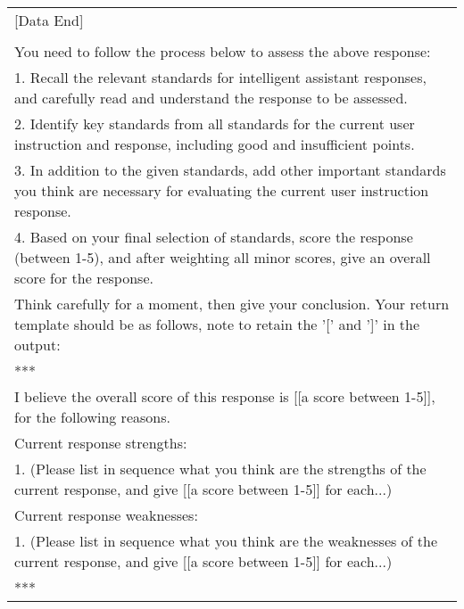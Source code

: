 \begin{table*}[tbh!]
\begin{tabularx}{\textwidth}{X}
    [Data End]\\
    
    \\
    You need to follow the process below to assess the above response:\\
    1. Recall the relevant standards for intelligent assistant responses, and carefully read and understand the response to be assessed.\\
    2. Identify key standards from all standards for the current user instruction and response, including good and insufficient points.\\
    3. In addition to the given standards, add other important standards you think are necessary for evaluating the current user instruction response.\\
    4. Based on your final selection of standards, score the response (between 1-5), and after weighting all minor scores, give an overall score for the response.\\
    Think carefully for a moment, then give your conclusion. Your return template should be as follows, note to retain the '[' and ']' in the output:\\
    ***\\
    I believe the overall score of this response is [[a score between 1-5]], for the following reasons.\\
    Current response strengths:\\
    1. (Please list in sequence what you think are the strengths of the current response, and give [[a score between 1-5]] for each...)\\
    Current response weaknesses:\\
    1. (Please list in sequence what you think are the weaknesses of the current response, and give [[a score between 1-5]] for each...)\\
    ***\\ 
    \bottomrule
  \end{tabularx}
\end{table*}

